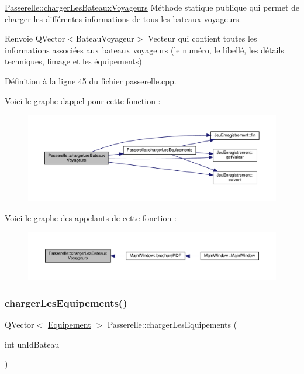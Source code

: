 \hyperlink{class_passerelle_a9f8cdd9d52d668bb33a5380324fb9c51}{Passerelle\+::charger\+Les\+Bateaux\+Voyageurs} Méthode statique publique qui permet de charger les différentes informations de tous les bateaux voyageurs. 

\begin{DoxyReturn}{Renvoie}
Q\+Vector$<$\+Bateau\+Voyageur$>$ Vecteur qui contient toutes les informations associées aux bateaux voyageurs (le numéro, le libellé, les détails techniques, l\textquotesingle{}image et les équipements) 
\end{DoxyReturn}


Définition à la ligne 45 du fichier passerelle.\+cpp.

Voici le graphe d\textquotesingle{}appel pour cette fonction \+:\nopagebreak
\begin{figure}[H]
\begin{center}
\leavevmode
\includegraphics[width=350pt]{class_passerelle_a9f8cdd9d52d668bb33a5380324fb9c51_cgraph}
\end{center}
\end{figure}
Voici le graphe des appelants de cette fonction \+:\nopagebreak
\begin{figure}[H]
\begin{center}
\leavevmode
\includegraphics[width=350pt]{class_passerelle_a9f8cdd9d52d668bb33a5380324fb9c51_icgraph}
\end{center}
\end{figure}
\mbox{\label{class_passerelle_a7388ba173e23ebf4ceb26d878e9503b3}} 
\subsubsection{\texorpdfstring{charger\+Les\+Equipements()}{chargerLesEquipements()}}
{\footnotesize\ttfamily Q\+Vector$<$ \hyperlink{class_equipement}{Equipement} $>$ Passerelle\+::charger\+Les\+Equipements (\begin{DoxyParamCaption}\item[{int}]{un\+Id\+Bateau }\end{DoxyParamCaption})\hspace{0.3cm}{\ttfamily [static]}}



